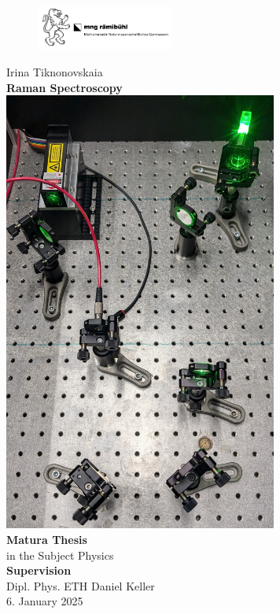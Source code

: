 \documentclass[a4paper]{article}
\date{November 2024}
\begin{document}
\thispagestyle{empty}

\begin{figure}
    \includegraphics[width=0.4\textwidth]{images/MNG_pic.png}
\end{figure}
\begin{center}
    \large
    Irina Tiknonovskaia\\
    \Huge \textbf{Raman Spectroscopy}
    \\[0.5cm]
    \includegraphics[width=9cm]{images/active_setup_photo.jpg}
    \\[0.5cm]
    \large
    \textbf{Matura Thesis}\\
    in the Subject Physics
    \\[0.25cm]
    \textbf{Supervision}\\
    Dipl. Phys. ETH Daniel Keller
    \\[0.25cm]
    6. January 2025
\end{center}
\newpage
{}
\end{document}
